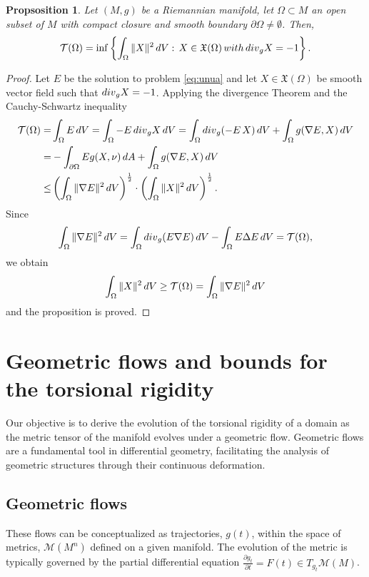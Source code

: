 \documentclass{amsart}
\newtheorem{proposition}[theorem]{Propsosition}
\theoremstyle{definition}
\theoremstyle{remark}
\begin{document}
\begin{proposition}\label{prop:lower_bounds_torsion}
    Let $(M,g)$ be a Riemannian manifold, let $\Omega\subset M$ an open subset of $M$ with compact closure and smooth boundary $\partial\Omega\neq \emptyset$.    Then,
    $$
\mathcal{T}(\Omega)=\inf \left\{\int_{\Omega}\Vert X\Vert^2\, d{\rm V}:\,X\in \mathfrak{X}(\Omega)\, {\rm with}\, {\rm div}_g X=-1 \right\}.
    $$
\end{proposition}
\begin{proof}
    Let $E$ be the solution to problem \eqref{eq:unua} and let $X\in \mathfrak{X}(\Omega)$ be smooth vector field such that ${\rm div}_g X=-1$. Applying the divergence Theorem and the Cauchy-Schwartz inequality 
    $$
    \begin{aligned}
        \mathcal{T}(\Omega)=&\int_\Omega E\, d{\rm V}=\int_\Omega -E\, {\rm div}_gX\, d{\rm V}=\int_\Omega{\rm div}_g(-E\, X)\, d{\rm V}+\int_\Omega g(\nabla E, X)\, d{\rm V}\\
        =&-\int_{\partial \Omega} E g(X, \nu)\, d{\rm A}+\int_\Omega g(\nabla E, X)\, d{\rm V} \\
        \leq &\left(\int_\Omega \Vert \nabla E\Vert^2\, d{\rm V}\right)^{\frac{1}{2}}\cdot \left(\int_\Omega \Vert X\Vert^2\, d{\rm V}\right)^{\frac{1}{2}}.
    \end{aligned}
    $$
    Since
    $$
\int_\Omega \Vert \nabla E\Vert^2\, d{\rm V} =\int_\Omega {\rm div}_g(E\nabla E)\, d{\rm V}-\int_\Omega E\Delta E\, d{\rm V}=\mathcal{T}(\Omega),
    $$
    we obtain
    $$
\int_\Omega \Vert X\Vert^2\, d{\rm V}\geq \mathcal{T}(\Omega)=\int_\Omega \Vert \nabla E\Vert^2\, d{\rm V}
    $$
    and the proposition is proved. 
\end{proof}

 \section{Geometric flows and bounds for the torsional rigidity }\label{sec:GF}

 Our objective is to derive the evolution of the torsional rigidity of a domain as the metric tensor of the manifold evolves under a geometric flow. Geometric flows are a fundamental tool in differential geometry, facilitating the analysis of geometric structures through their continuous deformation.
\subsection{Geometric flows}
 These flows can be conceptualized as trajectories, $g(t)$,  within the space of metrics, $\mathcal{M}(M^n)$ defined on a given manifold. The evolution of the metric is typically governed by the partial differential equation    $ \frac{\partial g_t}{\partial t}= F(t)\in T_{g_t}\mathcal{M}(M)$. 
\end{document}

